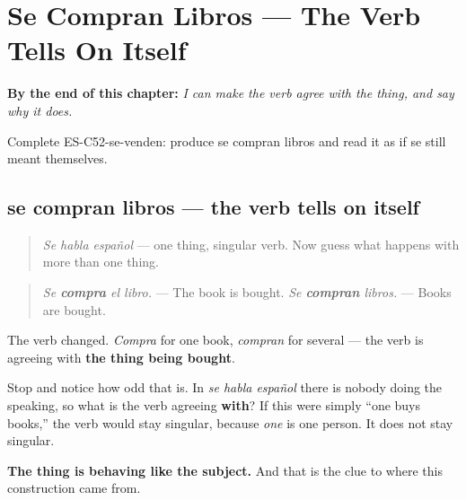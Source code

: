 
\chapter{Se Compran Libros --- The Verb Tells On Itself}
\label{ch:se-agreement}

\begin{chapteropening}
\textbf{By the end of this chapter:} \emph{I can make the verb agree with the thing, and say why it does.}

Complete ES-C52-se-venden: produce se compran libros and read it as if se still meant themselves.
\end{chapteropening}

\section[se compran libros]{se compran libros — the verb tells on itself}

\label{lesson:ES-C52-se-venden}



\begin{quote}
\emph{Se habla español} — one thing, singular verb. Now guess what happens with more than one thing.
\end{quote}

\begin{grammarlens}[title={Grammar Lens: it agrees, and that is strange}]
\begin{quote}
\emph{Se \textbf{compra} el libro.} — The book is bought. \emph{Se \textbf{compran} libros.} — Books are bought.
\end{quote}

The verb changed. \emph{Compra} for one book, \emph{compran} for several — the verb is agreeing with \textbf{the thing being bought}.

Stop and notice how odd that is. In \emph{se habla español} there is nobody doing the speaking, so what is the verb agreeing \textbf{with}? If this were simply \textquotedblleft{}one buys books,\textquotedblright{} the verb would stay singular, because \emph{one} is one person. It does not stay singular.

\textbf{The thing is behaving like the subject.} And that is the clue to where this construction came from.
\end{grammarlens}

